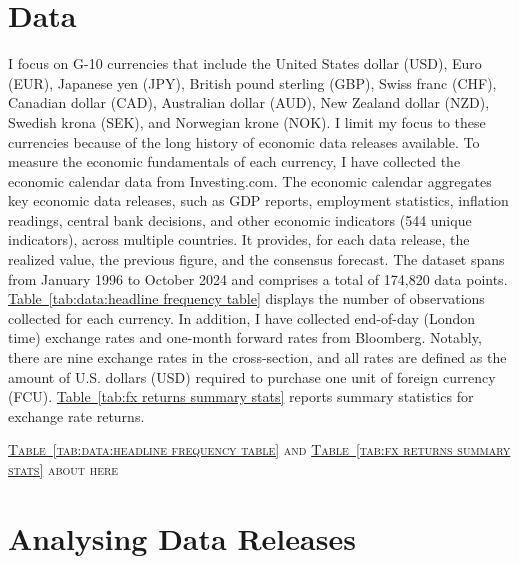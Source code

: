 \documentclass[12pt,oneside,letter]{article}
\newcommand*{\mytab}[1]{\hyperref[{#1}]{Table~\ref*{#1}}}
\begin{document}
	\section{Data}   \label{sec:data} 
	I focus on G-10 currencies that include the United States dollar (USD), Euro (EUR), Japanese yen (JPY), British pound sterling (GBP), Swiss franc (CHF), Canadian dollar (CAD), Australian dollar (AUD), New Zealand dollar (NZD), Swedish krona (SEK), and Norwegian krone (NOK). I limit my focus to these currencies because of the long history of economic data releases available. To measure the economic fundamentals of each currency, I have collected the economic calendar data from Investing.com. The economic calendar aggregates key economic data releases, such as GDP reports, employment statistics, inflation readings, central bank decisions, and other economic indicators (544 unique indicators), across multiple countries. It provides, for each data release, the realized value, the previous figure, and the consensus forecast. The dataset spans from January 1996 to October 2024 and comprises a total of 174,820 data points. \mytab{tab:data:headline frequency table} displays the number of observations collected for each currency. In addition, I have collected end-of-day (London time) exchange rates and one-month forward rates from Bloomberg. Notably, there are nine exchange rates in the cross-section, and all rates are defined as the amount of U.S. dollars (USD) required to purchase one unit of foreign currency (FCU). \mytab{tab:fx returns summary stats} reports summary statistics for exchange rate returns.
	\begin{center}
		\textsc{\mytab{tab:data:headline frequency table} and \mytab{tab:fx returns summary stats} about here} \vspace{0cm}
	\end{center} 
	\section{Analysing Data Releases}   \label{sec:Analysing Data Releases} 
\end{document}
